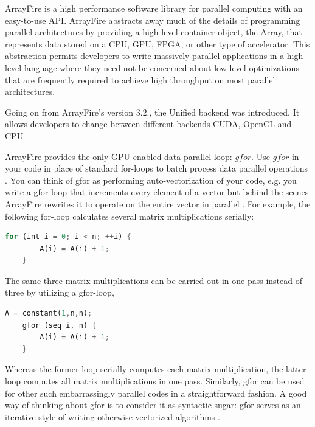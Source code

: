 ArrayFire is a high performance software library for parallel computing with an easy-to-use API. ArrayFire abstracts away much of the details of programming parallel architectures by providing a high-level container object, the Array, that represents data stored on a CPU, GPU, FPGA, or other type of accelerator. This abstraction permits developers to write massively parallel applications in a high-level language where they need not be concerned about low-level optimizations that are frequently required to achieve high throughput on most parallel architectures.

\citep{Yalamanchili2015}

Going on from ArrayFire's version 3.2., the Unified backend was introduced. It allows developers to change between different backends CUDA, OpenCL and CPU

ArrayFire provides the only GPU-enabled data-parallel loop: $gfor$. Use $gfor$ in your code in place of standard for-loops to batch process data parallel operations \citep{malcolmArrayFireGPUAcceleration2012a}. 
You can think of gfor as performing auto-vectorization of your code, e.g. you write a gfor-loop that increments every element of a vector but behind the scenes ArrayFire rewrites it to operate on the entire vector in parallel \citep{Yalamanchili2015}. For example, the following for-loop calculates several matrix multiplications serially:

\begin{lstlisting}[language=Rust, caption=Pseudo-code with imerative for loop]
	for (int i = 0; i < n; ++i) {
		A(i) = A(i) + 1;
	}
\end{lstlisting}

The same three matrix multiplications can be carried out in one pass instead of three by utilizing a gfor-loop,

\begin{lstlisting}[language=Rust, caption=Pseudo-code with if-statement removed]
	A = constant(1,n,n);
	gfor (seq i, n) {
		A(i) = A(i) + 1;
	}
\end{lstlisting}

Whereas the former loop serially computes each matrix multiplication, the latter loop computes all matrix multiplications in one pass. Similarly, gfor can be used for other such embarrassingly parallel codes in a straightforward fashion. A good way of thinking about gfor is to consider it as syntactic sugar: gfor serves as an iterative style of writing otherwise vectorized algorithms \citep{malcolmArrayFireGPUAcceleration2012a}.

